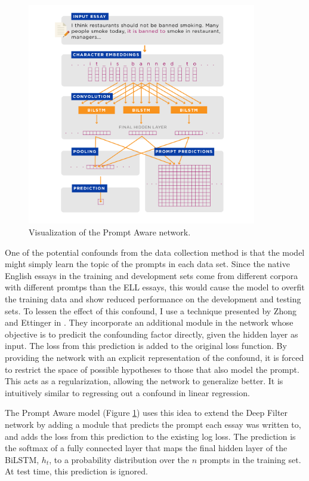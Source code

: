 \documentclass{article} %
\begin{document}
\begin{figure}[h]
\begin{center}
\includegraphics[width=10cm]{prompt-aware-pic.png}
\end{center}
\caption{Visualization of the Prompt Aware network.} \label{prompt-aware-pic}
\end{figure}

One of the potential confounds from the data collection method is that the model
might simply learn the topic of the prompts in each data set. Since the native
English essays in the training and development sets come from different corpora
with different promtps than the ELL essays, this would cause the model to overfit
the training data and show reduced performance on the development and testing sets.
To lessen the effect of this confound, I use a
technique presented by Zhong and Ettinger in \cite{zhong}. They incorporate an
additional module in the network whose objective is to predicit
the confounding factor directly, given the hidden layer as input. The loss from
this prediction is added to the original loss function. By providing the network
with an explicit representation of the confound, it is forced to restrict the space
of possible hypotheses to those that also model the prompt. This acts as a
regularization, allowing the network to generalize better. It is intuitively
similar to regressing out a confound in linear regression.

The Prompt Aware model (Figure \ref{prompt-aware-pic}) uses this idea to extend
the Deep Filter network by adding a module that predicts the prompt each essay
was written to, and adds the loss from this prediction to the existing log loss.
The prediction is the softmax of a fully connected layer that maps the final hidden
layer of the BiLSTM, $h_t$, to a probability distribution over the $n$ prompts
in the training set. At test time, this prediction is ignored.
\end{document}
